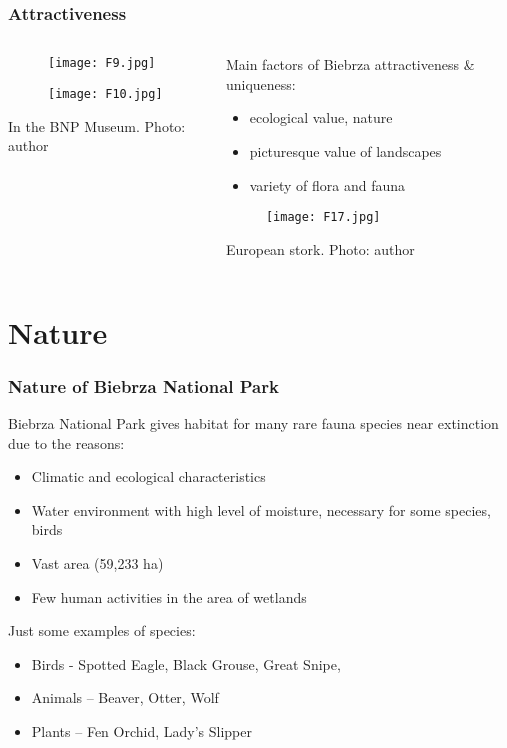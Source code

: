 \documentclass[pdflatex,compress,8pt,
	xcolor={dvipsnames,dvipsnames,svgnames,x11names,table},
	hyperref={colorlinks = true,
	breaklinks = true, urlcolor = NavyBlue, breaklinks = true}]{beamer}
\begin{document}
\begin{frame}\frametitle{Attractiveness}
\begin{minipage}[0.4\textheight]{\textwidth}
\begin{columns}[T]
\begin{column}{0.5\textwidth}
\vspace{2em}
\begin{figure}[H]
	\centering
		\texttt{[image: F9.jpg]}
\end{figure}
\begin{figure}[H]
	\centering
		\texttt{[image: F10.jpg]}
\end{figure}
\footnotesize{In the BNP Museum. Photo: author}
\end{column}
\begin{column}{0.5\textwidth}
\vspace{2em} 
Main factors of Biebrza attractiveness \& uniqueness:
\begin{itemize}
	\item ecological value, nature
	\item picturesque value of landscapes
	\item variety of flora and fauna
\end{itemize}
\begin{figure}[H]
	\centering
		\texttt{[image: F17.jpg]}
\end{figure}
\footnotesize{European stork. Photo: author}
\end{column}
\end{columns}
\end{minipage}
\end{frame}

\section{Nature}
\begin{frame}\frametitle{Nature of Biebrza National Park}
Biebrza National Park gives habitat for many rare fauna species near extinction due to the reasons: 
\begin{itemize}
	\item Climatic and ecological characteristics
	\item Water environment with high level of moisture, necessary for some species, birds
	\item Vast area (59,233 ha)
	\item Few human activities in the area of wetlands 
\end{itemize}
Just some examples of species:
\begin{itemize}
	\item Birds - Spotted Eagle, Black Grouse, Great Snipe, 
	\item Animals – Beaver, Otter, Wolf
	\item Plants – Fen Orchid, Lady’s Slipper
\end{itemize}
\end{frame}
\end{document}

